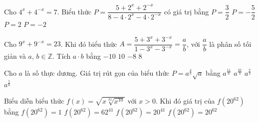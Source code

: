 \begin{ex}%
	Cho $4^x+4^{-x}=7$. Biểu thức $P=\dfrac{5+2^x+2^{-x}}{8-4\cdot 2^x-4\cdot 2^{-x}}$ có giá  trị bằng
	 \choice
		 {$P=\dfrac{3}{2}$}
		{$P=-\dfrac{5}{2}$} 
		{$P=2$} 
		{\True $P=-2$} 
\end{ex}

\begin{ex}%
	Cho $9^x+9^{-x}=23$. Khi đó biểu thức $A=\dfrac{5+3^x+3^{-x}}{1-3^x-3^{-x}}=\dfrac{a}{b}$, với $\dfrac{a}{b}$ là  phân số tối giản và $a$, $b\in\mathbb{Z}$. Tích $a\cdot b$ bằng
	 \choice
		 {\True $-10$}
		 {$10$}
		{$-8$} 
		{$8$} 
\end{ex}

\begin{ex}%
	 Cho $a$ là số thực dương. Giá trị rút gọn của biểu thức $P=a^{\tfrac{4}{3}} \sqrt{a}$ bằng
	 \choice
		 {\True$a^{\tfrac{11}{6}}$}
		 {$a^{\tfrac{10}{3}}$}
		 {$a^{\tfrac{7}{3}}$}
		{$a^{\tfrac{5}{6}}$} 
\end{ex}

\begin{ex}%
	Biểu diễn biểu thức  $f(x)=\sqrt{x\sqrt[31]{x^{10}}}$ với $x>0$. Khi đó giá trị của $f\left(20^{62}\right)$ bằng
	 \choice
		 {$f\left(20^{62}\right)=1$}
		{$f\left(20^{62}\right)=62^{41}$} 
		{\True $f\left(20^{62}\right)=20^{41}$} 
		{$f\left(20^{62}\right)=20^{62}$} 
\end{ex}

